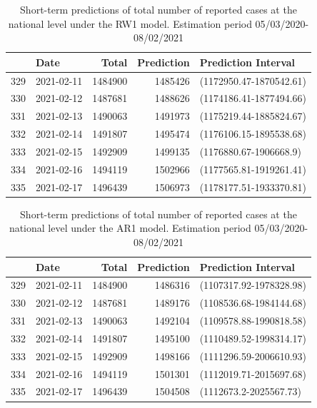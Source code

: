 \documentclass[10pt,letterpaper]{article}
\begin{document}
\begin{table}

\caption{\label{tab:unnamed-chunk-9}Short-term predictions of total number of reported cases at the national level under the RW1 model. Estimation period 05/03/2020-08/02/2021}
\centering
\begin{tabular}[t]{l|l|r|r|l}
\hline
  & Date & Total & Prediction & Prediction Interval\\
\hline
329 & 2021-02-11 & 1484900 & 1485426 & (1172950.47-1870542.61)\\
\hline
330 & 2021-02-12 & 1487681 & 1488626 & (1174186.41-1877494.66)\\
\hline
331 & 2021-02-13 & 1490063 & 1491973 & (1175219.44-1885824.67)\\
\hline
332 & 2021-02-14 & 1491807 & 1495474 & (1176106.15-1895538.68)\\
\hline
333 & 2021-02-15 & 1492909 & 1499135 & (1176880.67-1906668.9)\\
\hline
334 & 2021-02-16 & 1494119 & 1502966 & (1177565.81-1919261.41)\\
\hline
335 & 2021-02-17 & 1496439 & 1506973 & (1178177.51-1933370.81)\\
\hline
\end{tabular}
\end{table}

\begin{table}

\caption{\label{tab:unnamed-chunk-9}Short-term predictions of total number of reported cases at the national level under the AR1 model. Estimation period 05/03/2020-08/02/2021}
\centering
\begin{tabular}[t]{l|l|r|r|l}
\hline
  & Date & Total & Prediction & Prediction Interval\\
\hline
329 & 2021-02-11 & 1484900 & 1486316 & (1107317.92-1978328.98)\\
\hline
330 & 2021-02-12 & 1487681 & 1489176 & (1108536.68-1984144.68)\\
\hline
331 & 2021-02-13 & 1490063 & 1492104 & (1109578.88-1990818.58)\\
\hline
332 & 2021-02-14 & 1491807 & 1495100 & (1110489.52-1998314.17)\\
\hline
333 & 2021-02-15 & 1492909 & 1498166 & (1111296.59-2006610.93)\\
\hline
334 & 2021-02-16 & 1494119 & 1501301 & (1112019.71-2015697.68)\\
\hline
335 & 2021-02-17 & 1496439 & 1504508 & (1112673.2-2025567.73)\\
\hline
\end{tabular}
\end{table}
\end{document}
